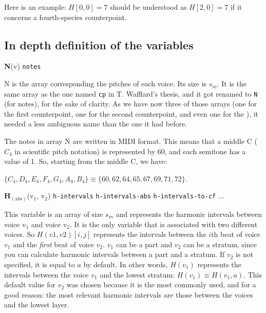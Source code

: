 Here is an example: $H[0, 0] = 7$ should be understood as $H[2, 0] = 7$ if it concerns a fourth-species counterpoint.

\subsection{In depth definition of the variables} \label{section:definition-variables}

\noindent \textbf{N}(v) \hspace{.2cm} \texttt{notes} 

N is the array corresponding the pitches of each voice. Its size is $s_m$. It is the same array as the one named \texttt{cp} in T. Wafflard's thesis, and it got renamed to \texttt{N} (for notes), for the sake of clarity. As we have now three of those arrays (one for the first counterpoint, one for the second counterpoint, and even one for the \cf), it needed a less ambiguous name than the one it had before. 

The notes in array N are written in MIDI format. This means that a middle C ($C_4$ in scientific pitch notation) is represented by 60, and each semitone has a value of 1. So, starting from the middle C, we have:

$\{C_4, D_4, E_4, F_4, G_4, A_4, B_4\} \equiv \{60, 62, 64, 65, 67, 69, 71, 72\}$.




\vspace{.5cm} \noindent \textbf{H}$_{(\text{abs})}$(v$_1$, v$_2$) \hspace{.2cm} \texttt{h-intervals}\hspace{.2cm} \texttt{h-intervals-abs}\hspace{.2cm} \texttt{h-intervals-to-cf}\hspace{.2cm}  ...

This variable is an array of size $s_m$ and represents the harmonic intervals between voice v$_1$ and voice v$_2$. It is the only variable that is associated with two different voices. So $H(v1,v2)[i,j]$ represents the intervals between the $i$th beat of voice $v_1$ and the \textit{first} beat of voice $v_2$. $v_1$ can be a part and $v_2$ can be a stratum, since you can calculate harmonic intervals between a part and a stratum. If $v_2$ is not specified, it is equal to $a$ by default. In other words, $H(v_1)$ represents the intervals between the voice $v_1$ and the lowest stratum: $H(v_1) \equiv H(v_1,a)$. This default value for $v_2$ was chosen because it is the most commonly used, and for a good reason: the most relevant harmonic intervals are those between the voices and the lowest layer.

